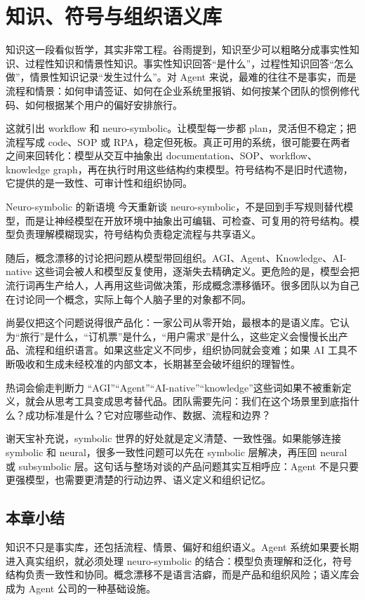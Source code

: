 \section{知识、符号与组织语义库}

知识这一段看似哲学，其实非常工程。谷雨提到，知识至少可以粗略分成事实性知识、过程性知识和情景性知识。事实性知识回答“是什么”，过程性知识回答“怎么做”，情景性知识记录“发生过什么”。对 Agent 来说，最难的往往不是事实，而是流程和情景：如何申请签证、如何在企业系统里报销、如何按某个团队的惯例修代码、如何根据某个用户的偏好安排旅行。

这就引出 workflow 和 neuro-symbolic。让模型每一步都 plan，灵活但不稳定；把流程写成 code、SOP 或 RPA，稳定但死板。真正可用的系统，很可能要在两者之间来回转化：模型从交互中抽象出 documentation、SOP、workflow、knowledge graph，再在执行时用这些结构约束模型。符号结构不是旧时代遗物，它提供的是一致性、可审计性和组织协同。

\begin{importantbox}{Neuro-symbolic 的新语境}
今天重新谈 neuro-symbolic，不是回到手写规则替代模型，而是让神经模型在开放环境中抽象出可编辑、可检查、可复用的符号结构。模型负责理解模糊现实，符号结构负责稳定流程与共享语义。
\end{importantbox}

随后，概念漂移的讨论把问题从模型带回组织。AGI、Agent、Knowledge、AI-native 这些词会被人和模型反复使用，逐渐失去精确定义。更危险的是，模型会把流行词再生产给人，人再用这些词做决策，形成概念漂移循环。很多团队以为自己在讨论同一个概念，实际上每个人脑子里的对象都不同。

尚晏仪把这个问题说得很产品化：一家公司从零开始，最根本的是语义库。它认为“旅行”是什么，“订机票”是什么，“用户需求”是什么，这些定义会慢慢长出产品、流程和组织语言。如果这些定义不同步，组织协同就会变难；如果 AI 工具不断吸收和生成未经校准的内部文本，长期甚至会破坏组织的理智性。

\begin{warningbox}{热词会偷走判断力}
“AGI”“Agent”“AI-native”“knowledge”这些词如果不被重新定义，就会从思考工具变成思考替代品。团队需要先问：我们在这个场景里到底指什么？成功标准是什么？它对应哪些动作、数据、流程和边界？
\end{warningbox}

谢天宝补充说，symbolic 世界的好处就是定义清楚、一致性强。如果能够连接 symbolic 和 neural，很多一致性问题可以先在 symbolic 层解决，再压回 neural 或 subsymbolic 层。这句话与整场对谈的产品问题其实互相呼应：Agent 不是只要更强模型，也需要更清楚的行动边界、语义定义和组织记忆。

\subsection{本章小结}

知识不只是事实库，还包括流程、情景、偏好和组织语义。Agent 系统如果要长期进入真实组织，就必须处理 neuro-symbolic 的结合：模型负责理解和泛化，符号结构负责一致性和协同。概念漂移不是语言洁癖，而是产品和组织风险；语义库会成为 Agent 公司的一种基础设施。

